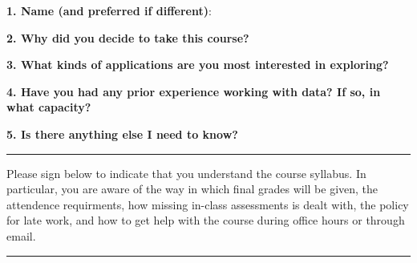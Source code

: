 \documentclass[12pt]{article}
\begin{document}
\textbf{1. Name (and preferred if different)}:

\vspace{1cm}

\textbf{2. Why did you decide to take this course?}

\vspace{4cm}

\textbf{3. What kinds of applications are you most interested in exploring?}

\vspace{4cm}

\textbf{4. Have you had any prior experience working with data? If so, in what capacity?}

\vspace{4cm}

\textbf{5. Is there anything else I need to know?}

\vspace{4cm}

\noindent\rule{19cm}{4pt}

\vspace{1cm}

Please sign below to indicate that you understand the course syllabus.
In particular, you are aware of the way in which final grades will be
given, the attendence requirments, how missing in-class assessments is
dealt with, the policy for late work, and how to get help with the
course during office hours or through email.

\vspace{2cm}

\noindent\quad\quad\rule{15cm}{2pt}
\end{document}
